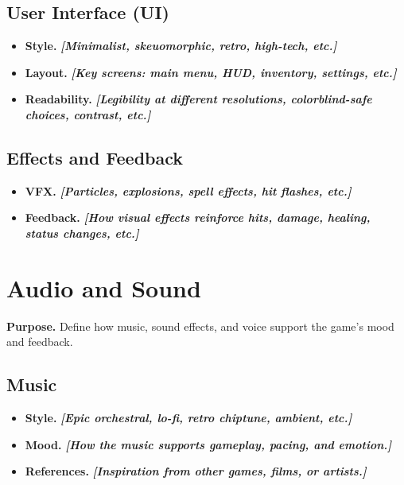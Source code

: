 \documentclass[12pt]{article}
\newcommand{\placeholder}[1]{\textbf{\textit{[#1]}}}
\begin{document}
\subsection{User Interface (UI)}

\begin{itemize}
    \item \textbf{Style.} \placeholder{Minimalist, skeuomorphic, retro, high-tech, etc.}
    \item \textbf{Layout.} \placeholder{Key screens: main menu, HUD, inventory, settings, etc.}
    \item \textbf{Readability.} \placeholder{Legibility at different resolutions, colorblind-safe choices, contrast, etc.}
\end{itemize}

\subsection{Effects and Feedback}

\begin{itemize}
    \item \textbf{VFX.} \placeholder{Particles, explosions, spell effects, hit flashes, etc.}
    \item \textbf{Feedback.} \placeholder{How visual effects reinforce hits, damage, healing, status changes, etc.}
\end{itemize}

\section{Audio and Sound}

\textbf{Purpose.} Define how music, sound effects, and voice support the game’s mood and feedback.

\subsection{Music}

\begin{itemize}
    \item \textbf{Style.} \placeholder{Epic orchestral, lo-fi, retro chiptune, ambient, etc.}
    \item \textbf{Mood.} \placeholder{How the music supports gameplay, pacing, and emotion.}
    \item \textbf{References.} \placeholder{Inspiration from other games, films, or artists.}
\end{itemize}
\end{document}
